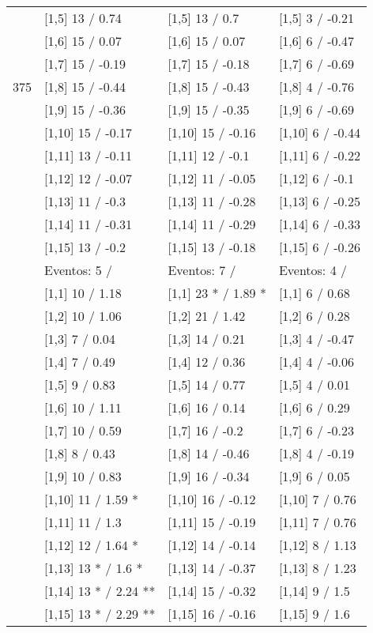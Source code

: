 \begin{table}
\begin{tabular}[t]{llll}
 & {}[1,5] 13  / 0.74 & {}[1,5] 13  / 0.7 & {}[1,5] 3  / -0.21\\
 & {}[1,6] 15  / 0.07 & {}[1,6] 15  / 0.07 & {}[1,6] 6  / -0.47\\
 & {}[1,7] 15  / -0.19 & {}[1,7] 15  / -0.18 & {}[1,7] 6  / -0.69\\
375 & {}[1,8] 15  / -0.44 & {}[1,8] 15  / -0.43 & {}[1,8] 4  / -0.76\\
\addlinespace
 & {}[1,9] 15  / -0.36 & {}[1,9] 15  / -0.35 & {}[1,9] 6  / -0.69\\
 & {}[1,10] 15  / -0.17 & {}[1,10] 15  / -0.16 & {}[1,10] 6  / -0.44\\
 & {}[1,11] 13  / -0.11 & {}[1,11] 12  / -0.1 & {}[1,11] 6  / -0.22\\
 & {}[1,12] 12  / -0.07 & {}[1,12] 11  / -0.05 & {}[1,12] 6  / -0.1\\
 & {}[1,13] 11  / -0.3 & {}[1,13] 11  / -0.28 & {}[1,13] 6  / -0.25\\
\addlinespace
 & {}[1,14] 11  / -0.31 & {}[1,14] 11  / -0.29 & {}[1,14] 6  / -0.33\\
 & {}[1,15] 13  / -0.2 & {}[1,15] 13  / -0.18 & {}[1,15] 6  / -0.26\\
 & Eventos:  5 / & Eventos:  7 / & Eventos:  4 /\\
 & {}[1,1] 10  / 1.18 & {}[1,1] 23 * / 1.89 * & {}[1,1] 6  / 0.68\\
 & {}[1,2] 10  / 1.06 & {}[1,2] 21  / 1.42 & {}[1,2] 6  / 0.28\\
\addlinespace
 & {}[1,3] 7  / 0.04 & {}[1,3] 14  / 0.21 & {}[1,3] 4  / -0.47\\
 & {}[1,4] 7  / 0.49 & {}[1,4] 12  / 0.36 & {}[1,4] 4  / -0.06\\
 & {}[1,5] 9  / 0.83 & {}[1,5] 14  / 0.77 & {}[1,5] 4  / 0.01\\
 & {}[1,6] 10  / 1.11 & {}[1,6] 16  / 0.14 & {}[1,6] 6  / 0.29\\
 & {}[1,7] 10  / 0.59 & {}[1,7] 16  / -0.2 & {}[1,7] 6  / -0.23\\
\addlinespace
500 & {}[1,8] 8  / 0.43 & {}[1,8] 14  / -0.46 & {}[1,8] 4  / -0.19\\
 & {}[1,9] 10  / 0.83 & {}[1,9] 16  / -0.34 & {}[1,9] 6  / 0.05\\
 & {}[1,10] 11  / 1.59 * & {}[1,10] 16  / -0.12 & {}[1,10] 7  / 0.76\\
 & {}[1,11] 11  / 1.3 & {}[1,11] 15  / -0.19 & {}[1,11] 7  / 0.76\\
 & {}[1,12] 12  / 1.64 * & {}[1,12] 14  / -0.14 & {}[1,12] 8  / 1.13\\
\addlinespace
 & {}[1,13] 13 * / 1.6 * & {}[1,13] 14  / -0.37 & {}[1,13] 8  / 1.23\\
 & {}[1,14] 13 * / 2.24 ** & {}[1,14] 15  / -0.32 & {}[1,14] 9  / 1.5\\
 & {}[1,15] 13 * / 2.29 ** & {}[1,15] 16  / -0.16 & {}[1,15] 9  / 1.6\\
\bottomrule
\end{tabular}
\end{table}
